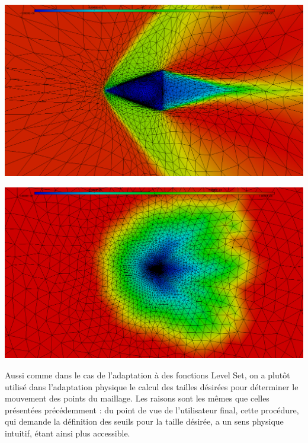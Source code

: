 \indent

\begingroup
	\begin{minipage}[t]{.5\linewidth}
		\includegraphics[scale=.15]{Bordeaux/figures/AdapPhysique/u.png}
	\end{minipage}
	\hfill
	\begin{minipage}[t]{.5\linewidth}
		\includegraphics[scale=.15]{Bordeaux/figures/AdapPhysique/met.png}
	\end{minipage}	
\endgroup

\indent

\indent Aussi comme dans le cas de l'adaptation à des fonctions Level Set, on a plutôt utilisé dans l'adaptation physique le calcul des tailles désirées pour déterminer le mouvement des points du maillage. Les raisons sont les mêmes que celles présentées précédemment : du point de vue de l'utilisateur final, cette procédure, qui demande la définition des seuils pour la taille désirée, a un sens physique intuitif, étant ainsi plus accessible.

